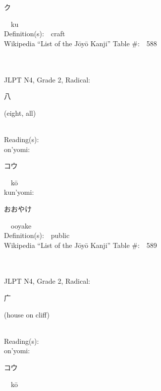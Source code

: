 \begin{multicols}{2}
{\hspace*{2em}}{\begin{CJK}{UTF8}{min} ク \end{CJK}}\ \ ku\ \ \\
Definition(s):\ \ craft \\
Wikipedia ``List of the J\=oy\=o Kanji'' Table \#:\ \ 588 \\
\ \ \\
{\fontsize{34pt}{40pt}  }\ \ \\  %
{JLPT N4, Grade 2, Radical:\ \ {\begin{CJK}{UTF8}{min} 八 \end{CJK}} (eight, all) } \\
Reading(s):\ \ \\
{\hspace*{1em}}on'yomi:\ \ \\
{\hspace*{2em}}{\begin{CJK}{UTF8}{min} コウ \end{CJK}}\ \ k\=o\ \ \\
{\hspace*{1em}}kun'yomi:\ \ \\
{\hspace*{2em}}{\begin{CJK}{UTF8}{min} おおやけ \end{CJK}}\ \ ooyake\ \ \\
Definition(s):\ \ public \\
Wikipedia ``List of the J\=oy\=o Kanji'' Table \#:\ \ 589 \\
\ \ \\
{\fontsize{34pt}{40pt}  }\ \ \\  %
{JLPT N4, Grade 2, Radical:\ \ {\begin{CJK}{UTF8}{min} 广 \end{CJK}} (house on cliff) } \\
Reading(s):\ \ \\
{\hspace*{1em}}on'yomi:\ \ \\
{\hspace*{2em}}{\begin{CJK}{UTF8}{min} コウ \end{CJK}}\ \ k\=o\ \ \\

\end{multicols}
